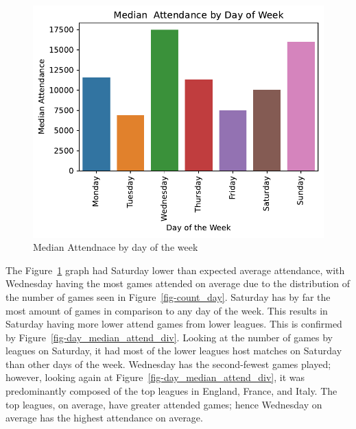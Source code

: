 \documentclass[
  letterpaper,
  DIV=11,
  numbers=noendperiod]{scrartcl}
\begin{document}
\begin{figure}[H]

{\centering \includegraphics{Blog_post_files/figure-pdf/fig-day_median_attend-output-1.pdf}

}

\caption{\label{fig-day_median_attend}Median Attendnace by day of the
week}

\end{figure}

The Figure~\ref{fig-day_median_attend} graph had Saturday lower than
expected average attendance, with Wednesday having the most games
attended on average due to the distribution of the number of games seen
in Figure~\ref{fig-count_day}. Saturday has by far the most amount of
games in comparison to any day of the week. This results in Saturday
having more lower attend games from lower leagues. This is confirmed by
Figure~\ref{fig-day_median_attend_div}. Looking at the number of games
by leagues on Saturday, it had most of the lower leagues host matches on
Saturday than other days of the week. Wednesday has the second-fewest
games played; however, looking again at
Figure~\ref{fig-day_median_attend_div}, it was predominantly composed of
the top leagues in England, France, and Italy. The top leagues, on
average, have greater attended games; hence Wednesday on average has the
highest attendance on average.
\end{document}
